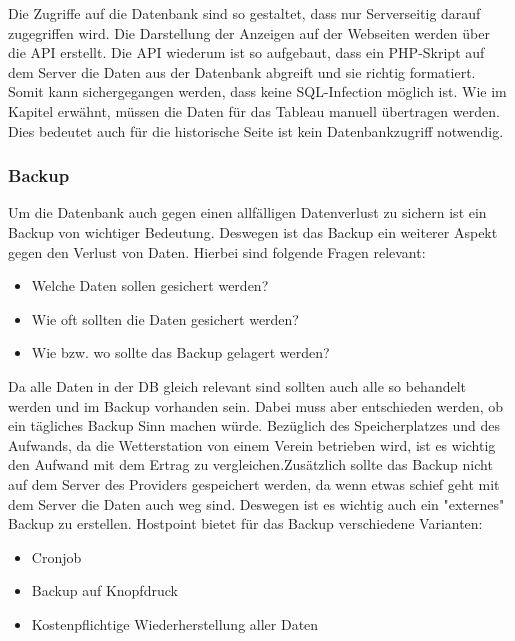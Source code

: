 Die Zugriffe auf die Datenbank sind so gestaltet, dass nur Serverseitig darauf zugegriffen wird. Die Darstellung der Anzeigen auf der Webseiten werden über die API erstellt. Die API wiederum ist so aufgebaut, dass ein PHP-Skript auf dem Server die Daten aus der Datenbank abgreift und sie richtig formatiert. Somit kann sichergegangen werden, dass keine SQL-Infection möglich ist. Wie im Kapitel  erwähnt, müssen die Daten für das Tableau manuell übertragen werden. Dies bedeutet auch für die historische Seite ist kein Datenbankzugriff notwendig.

\subsubsection{Backup}
Um die Datenbank auch gegen einen allfälligen Datenverlust zu sichern ist ein Backup von wichtiger Bedeutung. Deswegen ist das Backup ein weiterer Aspekt gegen den Verlust von Daten. Hierbei sind folgende Fragen relevant:
\begin{itemize}
\item Welche Daten sollen gesichert werden?
\item Wie oft sollten die Daten gesichert werden?
\item Wie bzw. wo sollte das Backup gelagert werden?
\end{itemize}

Da alle Daten in der DB gleich relevant sind sollten auch alle so behandelt werden und im Backup vorhanden sein. Dabei muss aber entschieden werden, ob ein tägliches Backup Sinn machen würde. Bezüglich des Speicherplatzes und des Aufwands, da die Wetterstation von einem Verein betrieben wird, ist es wichtig den Aufwand mit dem Ertrag zu vergleichen.Zusätzlich sollte das Backup nicht auf dem Server des Providers gespeichert werden, da wenn etwas schief geht mit dem Server die Daten auch weg sind. Deswegen ist es wichtig auch ein "externes" Backup zu erstellen. Hostpoint bietet für das Backup verschiedene Varianten:
\begin{itemize}
\item Cronjob
\item Backup auf Knopfdruck
\item Kostenpflichtige Wiederherstellung aller Daten
\end{itemize}


